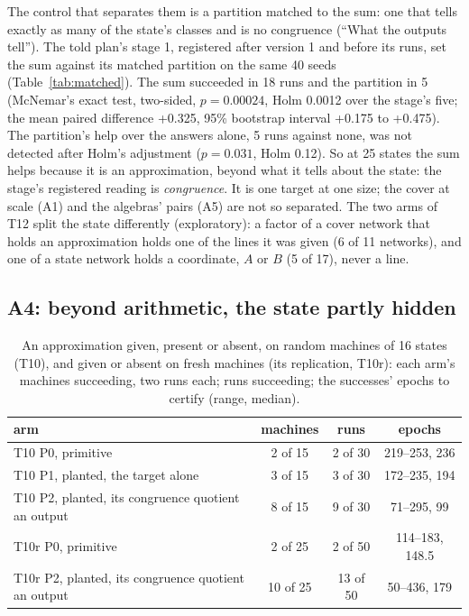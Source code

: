 \documentclass[11pt]{article}
\newcommand{\pn}[2]{#2}
\begin{document}
The control that separates them is a partition matched to the sum: one that tells exactly as many
of the state's classes and is no congruence (``What the outputs tell''). The told plan's stage 1,
registered after version 1 and before its runs, set the sum against its matched partition on the
same 40 seeds (Table~\ref{tab:matched}). The sum succeeded in \pn{told1.d5-sum}{18} runs and the
partition in \pn{told1.d5-matched}{5} (McNemar's exact test, two-sided,
$p = \pn{told1.congruence-p}{0.00024}$, Holm \pn{told1.congruence-holm}{0.0012} over the stage's
five; the mean paired difference \pn{told1.congruence-mean}{+0.325}, 95\% bootstrap interval
\pn{told1.congruence-interval}{+0.175 to +0.475}). The partition's help over the answers alone,
\pn{told1.d5-matched}{5} runs against \pn{told1.d5-quotient}{none}, was not detected after Holm's
adjustment ($p = \pn{told1.information-p}{0.031}$, Holm \pn{told1.information-holm}{0.12}). So at
25 states the sum helps because it is an approximation, beyond what it tells about the state: the
stage's registered reading is \emph{congruence}. It is one target at one size; the cover at scale
(A1) and the algebras' pairs (A5) are not so separated. The two arms of T12
split the state differently (exploratory): a factor of a cover network that holds an approximation
holds one of the lines it was given (\pn{t12.cover-lines}{6} of \pn{t12.cover-networks}{11}
networks), and one of a state network holds a coordinate, $A$ or $B$
(\pn{t12.state-lines}{5} of \pn{t12.state-networks}{17}), never a line.

\subsection{A4: beyond arithmetic, the state partly hidden}
\label{sec:a4}

\begin{table}[t]
\centering
\caption{An approximation given, present or absent, on random machines of 16 states (T10), and
given or absent on fresh machines (its replication, T10r): each arm's machines succeeding, two runs
each; runs succeeding; the successes' epochs to certify (range, median).}
\label{tab:planted}
\begin{tabular}{lccc}
\toprule
arm & machines & runs & epochs \\
\midrule
T10 P0, primitive & 2 of 15 & 2 of 30 & 219--253, 236 \\
T10 P1, planted, the target alone & 3 of 15 & 3 of 30 & 172--235, 194 \\
T10 P2, planted, its congruence quotient an output & 8 of 15 & 9 of 30 & 71--295, 99 \\
T10r P0, primitive & 2 of 25 & 2 of 50 & 114--183, 148.5 \\
T10r P2, planted, its congruence quotient an output & 10 of 25 & 13 of 50 & 50--436, 179 \\
\bottomrule
\end{tabular}
\end{table}
\end{document}
